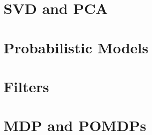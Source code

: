 \documentclass[a4paper, 12pt]{report}
\begin{document}
    

    \chapter{SVD and PCA}

    

    \chapter{Probabilistic Models}

    

    \chapter{Filters}

    

    \chapter{MDP and POMDPs}

    
\end{document}
